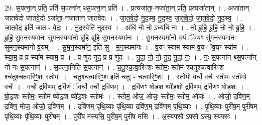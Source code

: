 \documentclass[17pt]{extarticle}
\begin{document}
29. स॒पत्ना॒न् प्रति॒ प्रति॑ स॒पत्ना᳚न् थ्स॒पत्ना॒न् प्रति॑ । . प्रत्यजा॑ता॒-नजा॑ता॒न् प्रति॒ प्रत्यजा॑तान् । . अजा॑तान् जातवेदो जातवे॒दो ऽजा॑ता॒-नजा॑तान् जातवेदः । . जा॒त॒वे॒दो॒ नु॒द॒स्व॒ नु॒द॒स्व॒ जा॒त॒वे॒दो॒ जा॒त॒वे॒दो॒ नु॒द॒स्व॒ । . जा॒त॒वे॒द॒ इति॑ जात - वे॒दः॒ । . नु॒द॒स्वेति॑ नुदस्व । . अधि॑ नो नो॒ ऽध्यधि॑ नः । . नो॒ ब्रू॒हि॒ ब्रू॒हि॒ नो॒ नो॒ ब्रू॒हि॒ । . ब्रू॒हि॒ सु॒म॒न॒स्यमा॑नः सुमन॒स्यमा॑नो ब्रूहि ब्रूहि सुमन॒स्यमा॑नः । . सु॒म॒न॒स्यमा॑नो व॒यं ॅव॒यꣳ सु॑मन॒स्यमा॑नः सुमन॒स्यमा॑नो व॒यम् । . सु॒म॒न॒स्यमा॑न॒ इति॑ सु - म॒न॒स्यमा॑नः । . व॒यꣳ स्या॑म स्याम व॒यं ॅव॒यꣳ स्या॑म । . स्या॒म॒ प्र प्र स्या॑म स्याम॒ प्र । . प्र णु॑द नुद॒ प्र प्र णु॑द । . नु॒दा॒ नो॒ नो॒ नु॒द॒ नु॒दा॒ नः॒ । . नः॒ स॒पत्ना᳚न् थ्स॒पत्ना᳚न् नो नः स॒पत्नान्॑ । . स॒पत्ना॒निति॑ स॒पत्नान्॑ । . च॒तु॒श्च॒त्वा॒रिꣳ॒॒शः स्तोमः॒ स्तोम॑ श्चतुश्चत्वारिꣳ॒॒श श्च॑तुश्चत्वारिꣳ॒॒शः स्तोमः॑ । . च॒तु॒श्च॒त्वा॒रिꣳ॒॒श इति॑ चतुः - च॒त्वा॒रिꣳ॒॒शः । . स्तोमो॒ वर्चो॒ वर्चः॒ स्तोमः॒ स्तोमो॒ वर्चः॑ । . वर्चो॒ द्रवि॑ण॒म् द्रवि॑णं॒ ॅवर्चो॒ वर्चो॒ द्रवि॑णम् । . द्रवि॑णꣳ षोड॒श ष्षो॑ड॒शो द्रवि॑ण॒म् द्रवि॑णꣳ षोड॒शः । . षो॒ड॒शः स्तोमः॒ स्तोम॑ ष्षोड॒श ष्षो॑ड॒शः स्तोमः॑ । . स्तोम॒ ओज॒ ओजः॒ स्तोमः॒ स्तोम॒ ओजः॑ । . ओजो॒ द्रवि॑ण॒म् द्रवि॑ण॒ मोज॒ ओजो॒ द्रवि॑णम् । . द्रवि॑णम् पृथि॒व्याः पृ॑थि॒व्या द्रवि॑ण॒म् द्रवि॑णम् पृथि॒व्याः । . पृ॒थि॒व्याः पुरी॑ष॒म् पुरी॑षम् पृथि॒व्याः पृ॑थि॒व्याः पुरी॑षम् । . पुरी॑ष मस्यसि॒ पुरी॑ष॒म् पुरी॑ष मसि । . अ॒स्यफ्सो ऽफ्सो᳚ ऽस्य॒ स्यफ्सः॑ । \newline
\end{document}

